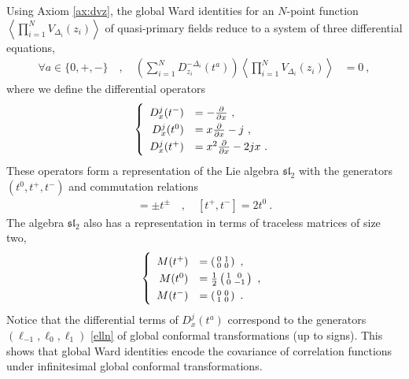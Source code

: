 \documentclass[12pt, a4paper, notitlepage, twoside]{report}
\numberwithin{equation}{section}
\theoremstyle{break}
\begin{document}
Using Axiom \ref{ax:dvz}, the global Ward identities for an $N$-point function $\left\langle \prod_{i=1}^N V_{\Delta_i}(z_i)\right\rangle$ of quasi-primary fields reduce to a system of three differential equations, 
\begin{align}
\forall a \in \{0,+,-\}\quad , \quad 
 \left(\sum_{i=1}^N D_{z_i}^{-\Delta_i}(t^a)\right) \left\langle \prod_{i=1}^N V_{\Delta_i}(z_i)\right\rangle & = 0\ ,
\label{spz}
\end{align}
where we define the differential operators
\begin{align}
\renewcommand{\arraystretch}{1.3}
 \left\{ \begin{array}{rl} D_x^{j}(t^-) & = -{\frac{\partial}{\partial x}}\ ,
\\
D_x^{j}(t^0) &  = x{\frac{\partial}{\partial x}} -j\ ,
\\
D_x^{j}(t^+) & = x^2{\frac{\partial}{\partial x}} - 2j x \ .
\end{array}\right. 
\label{ddz}
\end{align}
These operators form a representation of the Lie algebra \textbf{\boldmath $\mathfrak{sl}_2$}  with the generators $(t^0,t^+,t^-)$ and commutation relations 
\begin{align}
 [t^0,t^\pm ] =\pm t^\pm \quad , \quad [t^+,t^-]=2t^0\ .
\label{ttpm}
\end{align}
The algebra $\mathfrak{sl}_2$ also has a representation in terms of traceless matrices of size two,
\begin{align}
\renewcommand{\arraystretch}{1.3}
\left\{ \begin{array}{rl}
 M(t^+)& = \left(\begin{smallmatrix} 0 & 1 \\ 0& 0 \end{smallmatrix} \right) \ , 
\\
 M(t^0) &= \frac12\left(\begin{smallmatrix} 1 & 0 \\ 0 & -1 \end{smallmatrix}\right)\ ,
\\
M(t^-) & = \left(\begin{smallmatrix} 0 & 0 \\ 1 & 0 \end{smallmatrix} \right) \ .
\end{array} \right.
\label{mta}
\end{align}
Notice that the differential terms of $D^j_x(t^a)$ correspond to the generators $(\ell_{-1},\ell_0,\ell_1)$ \eqref{elln} of global conformal transformations (up to signs).
This shows that global Ward identities encode the covariance of correlation functions under infinitesimal global conformal transformations.
\end{document}
